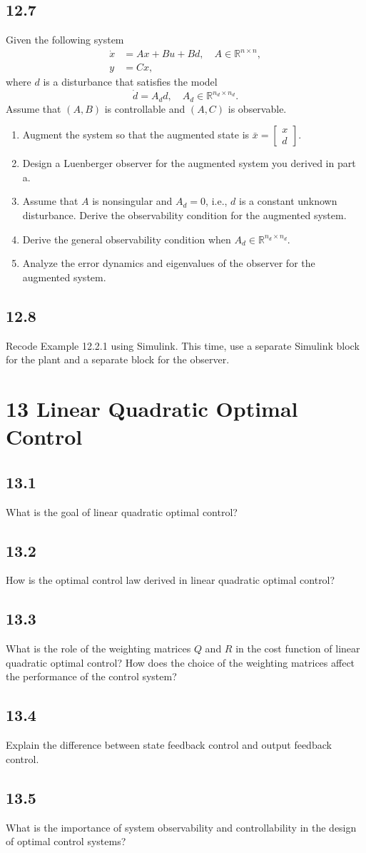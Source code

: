 \documentclass{article}
\newcommand{\problem}[2]{\subsection*{#1}}
\begin{document}
\problem{12.7}{}
Given the following system
\[
\begin{aligned}
\dot{x} &= Ax + Bu + Bd, \quad A \in \mathbb{R}^{n \times n}, \\
y &= Cx,
\end{aligned}
\]
where $d$ is a disturbance that satisfies the model
\[
\dot{d} = A_d d, \quad A_d \in \mathbb{R}^{n_d \times n_d}.
\]
Assume that $(A, B)$ is controllable and $(A, C)$ is observable.
\begin{enumerate}
\item Augment the system so that the augmented state is $\bar{x} = \begin{bmatrix} x \\ d \end{bmatrix}$.
\item Design a Luenberger observer for the augmented system you derived in part a.
\item Assume that $A$ is nonsingular and $A_d = 0$, i.e., $d$ is a constant unknown disturbance. Derive the observability condition for the augmented system.
\item Derive the general observability condition when $A_d \in \mathbb{R}^{n_d \times n_d}$.
\item Analyze the error dynamics and eigenvalues of the observer for the augmented system.
\end{enumerate}

\problem{12.8}{}
Recode Example 12.2.1 using Simulink. This time, use a separate Simulink block for the plant and a separate block for the observer.

\section*{13 Linear Quadratic Optimal Control}

\problem{13.1}{lq-concepts}
What is the goal of linear quadratic optimal control?

\problem{13.2}{lq-concepts}
How is the optimal control law derived in linear quadratic optimal control?

\problem{13.3}{lq-concepts}
What is the role of the weighting matrices $Q$ and $R$ in the cost function of linear quadratic optimal control? How does the choice of the weighting matrices affect the performance of the control system?

\problem{13.4}{lq-concepts}
Explain the difference between state feedback control and output feedback control.

\problem{13.5}{lq-concepts}
What is the importance of system observability and controllability in the design of optimal control systems?
\end{document}
